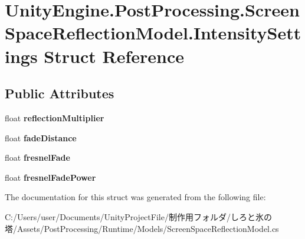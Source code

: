 \hypertarget{struct_unity_engine_1_1_post_processing_1_1_screen_space_reflection_model_1_1_intensity_settings}{}\section{Unity\+Engine.\+Post\+Processing.\+Screen\+Space\+Reflection\+Model.\+Intensity\+Settings Struct Reference}
\label{struct_unity_engine_1_1_post_processing_1_1_screen_space_reflection_model_1_1_intensity_settings}
\subsection*{Public Attributes}
\begin{DoxyCompactItemize}
\item 
\mbox{\label{struct_unity_engine_1_1_post_processing_1_1_screen_space_reflection_model_1_1_intensity_settings_a8ec48b86aaff338720873b3e43c49b2f}} 
float {\bfseries reflection\+Multiplier}
\item 
\mbox{\label{struct_unity_engine_1_1_post_processing_1_1_screen_space_reflection_model_1_1_intensity_settings_a50700644ca17276c6f9c09bbbe53254d}} 
float {\bfseries fade\+Distance}
\item 
\mbox{\label{struct_unity_engine_1_1_post_processing_1_1_screen_space_reflection_model_1_1_intensity_settings_a597e8b8b62d8004069320a12fb793efd}} 
float {\bfseries fresnel\+Fade}
\item 
\mbox{\label{struct_unity_engine_1_1_post_processing_1_1_screen_space_reflection_model_1_1_intensity_settings_ab03bececad8d540f7619542a5bb3f9fb}} 
float {\bfseries fresnel\+Fade\+Power}
\end{DoxyCompactItemize}


The documentation for this struct was generated from the following file\+:\begin{DoxyCompactItemize}
\item 
C\+:/\+Users/user/\+Documents/\+Unity\+Project\+File/制作用フォルダ/しろと氷の塔/\+Assets/\+Post\+Processing/\+Runtime/\+Models/Screen\+Space\+Reflection\+Model.\+cs\end{DoxyCompactItemize}

